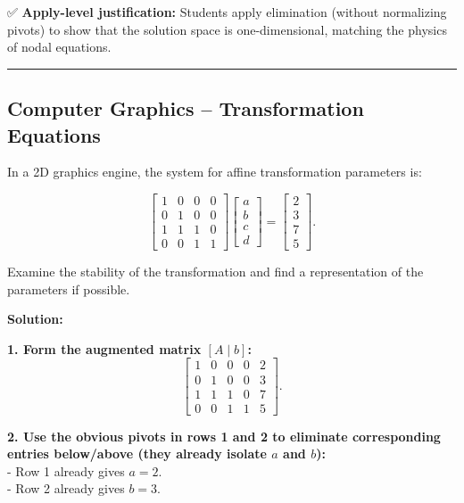 \documentclass[
  letterpaper,
  DIV=11,
  numbers=noendperiod]{scrreprt}
\begin{document}
✅ \textbf{Apply-level justification:} Students apply elimination
(without normalizing pivots) to show that the solution space is
one-dimensional, matching the physics of nodal equations.

\begin{center}\rule{0.5\linewidth}{0.5pt}\end{center}

\subsection{Computer Graphics -- Transformation
Equations}\label{computer-graphics-transformation-equations}

In a 2D graphics engine, the system for affine transformation parameters
is:

\[
\begin{bmatrix}
1 & 0 & 0 & 0 \\
0 & 1 & 0 & 0 \\
1 & 1 & 1 & 0 \\
0 & 0 & 1 & 1
\end{bmatrix}
\begin{bmatrix} a \\ b \\ c \\ d \end{bmatrix}
=
\begin{bmatrix} 2 \\ 3 \\ 7 \\ 5 \end{bmatrix}.
\]

Examine the stability of the transformation and find a representation of
the parameters if possible.

\textbf{Solution:}

\textbf{1. Form the augmented matrix \([A\mid b]\):} \[
\left[\begin{array}{cccc|c}
1 & 0 & 0 & 0 & 2\\[4pt]
0 & 1 & 0 & 0 & 3\\[4pt]
1 & 1 & 1 & 0 & 7\\[4pt]
0 & 0 & 1 & 1 & 5
\end{array}\right].
\]

\textbf{2. Use the obvious pivots in rows 1 and 2 to eliminate
corresponding entries below/above (they already isolate \(a\) and
\(b\)):}\\
- Row 1 already gives \(a = 2\).\\
- Row 2 already gives \(b = 3\).
\end{document}

